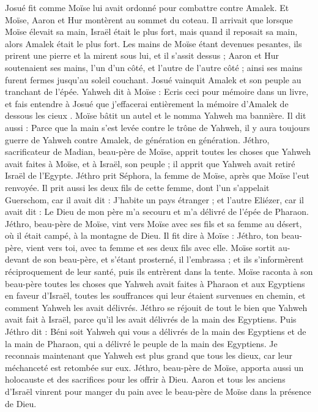 \begin{multicols}{2}
Josué fit comme Moïse lui avait ordonné pour combattre contre Amalek. Et Moïse, Aaron et Hur montèrent au sommet du coteau.
Il arrivait que lorsque Moïse élevait sa main, Israël était le plus fort, mais quand il reposait sa main, alors Amalek était le plus fort.
Les mains de Moïse étant devenues pesantes, ils prirent une pierre et la mirent sous lui, et il s'assit dessus ; Aaron et Hur soutenaient ses mains, l'un d’un côté, et l'autre de l’autre côté ; ainsi ses mains furent fermes jusqu'au soleil couchant.
Josué vainquit Amalek et son peuple au tranchant de l'épée.
Yahweh dit à Moïse : Ecris ceci pour mémoire dans un livre, et fais entendre à Josué que j'effacerai entièrement la mémoire d'Amalek de dessous les cieux .
Moïse bâtit un autel et le nomma Yahweh ma bannière.
Il dit aussi : Parce que la main s’est levée contre le trône de Yahweh, il y aura toujours guerre de Yahweh contre Amalek, de génération en génération.
\VerseOne{}Jéthro, sacrificateur de Madian, beau-père de Moïse, apprit toutes les choses que Yahweh avait faites à Moïse, et à Israël, son peuple ; il apprit que Yahweh avait retiré Israël de l'Egypte.
Jéthro prit Séphora, la femme de Moïse, après que Moïse l'eut renvoyée.
Il prit aussi les deux fils de cette femme, dont l'un s'appelait Guerschom, car il avait dit : J’habite un pays étranger ;
et l'autre Eliézer, car il avait dit : Le Dieu de mon père m'a secouru et m'a délivré de l'épée de Pharaon.
Jéthro, beau-père de Moïse, vint vers Moïse avec ses fils et sa femme au désert, où il était campé, à la montagne de Dieu.
Il fit dire à Moïse : Jéthro, ton beau-père, vient vers toi, avec ta femme et ses deux fils avec elle.
Moïse sortit au-devant de son beau-père, et s'étant prosterné, il l’embrassa ; et ils s’informèrent réciproquement de leur santé, puis ils entrèrent dans la tente.
Moïse raconta à son beau-père toutes les choses que Yahweh avait faites à Pharaon et aux Egyptiens en faveur d'Israël, toutes les souffrances qui leur étaient survenues en chemin, et comment Yahweh les avait délivrés.
Jéthro se réjouit de tout le bien que Yahweh avait fait à Israël, parce qu'il les avait délivrés de la main des Egyptiens.
Puis Jéthro dit : Béni soit Yahweh qui vous a délivrés de la main des Egyptiens et de la main de Pharaon, qui a délivré le peuple de la main des Egyptiens.
Je reconnais maintenant que Yahweh est plus grand que tous les dieux, car leur méchanceté est retombée sur eux.
Jéthro, beau-père de Moïse, apporta aussi un holocauste et des sacrifices pour les offrir à Dieu. Aaron et tous les anciens d'Israël vinrent pour manger du pain avec le beau-père de Moïse dans la présence de Dieu.

\end{multicols}
